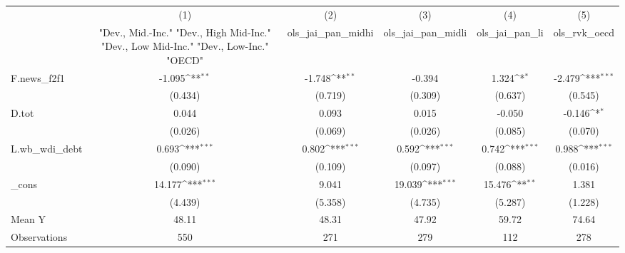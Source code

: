 {
\def\sym#1{\ifmmode^{#1}\else\(^{#1}\)\fi}
\begin{tabular}{l*{5}{c}}
\toprule
            &\multicolumn{1}{c}{(1)}&\multicolumn{1}{c}{(2)}&\multicolumn{1}{c}{(3)}&\multicolumn{1}{c}{(4)}&\multicolumn{1}{c}{(5)}\\
            &\multicolumn{1}{c}{ "Dev., Mid.-Inc." "Dev., High Mid-Inc." "Dev., Low Mid-Inc." "Dev., Low-Inc." "OECD" }&\multicolumn{1}{c}{ols\_jai\_pan\_midhi}&\multicolumn{1}{c}{ols\_jai\_pan\_midli}&\multicolumn{1}{c}{ols\_jai\_pan\_li}&\multicolumn{1}{c}{ols\_rvk\_oecd}\\
\midrule
F.news\_f2f1 &      -1.095\sym{**} &      -1.748\sym{**} &      -0.394         &       1.324\sym{*}  &      -2.479\sym{***}\\
            &     (0.434)         &     (0.719)         &     (0.309)         &     (0.637)         &     (0.545)         \\
\addlinespace
D.tot       &       0.044         &       0.093         &       0.015         &      -0.050         &      -0.146\sym{*}  \\
            &     (0.026)         &     (0.069)         &     (0.026)         &     (0.085)         &     (0.070)         \\
\addlinespace
L.wb\_wdi\_debt&       0.693\sym{***}&       0.802\sym{***}&       0.592\sym{***}&       0.742\sym{***}&       0.988\sym{***}\\
            &     (0.090)         &     (0.109)         &     (0.097)         &     (0.088)         &     (0.016)         \\
\addlinespace
\_cons      &      14.177\sym{***}&       9.041         &      19.039\sym{***}&      15.476\sym{**} &       1.381         \\
            &     (4.439)         &     (5.358)         &     (4.735)         &     (5.287)         &     (1.228)         \\
\midrule
Mean Y      &       48.11         &       48.31         &       47.92         &       59.72         &       74.64         \\
Observations&         550         &         271         &         279         &         112         &         278         \\
\bottomrule
\end{tabular}
}
